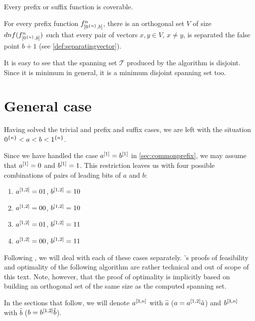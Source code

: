 \begin{corollary}
\label{corollary:prefixsuffixcoverable}
Every prefix or suffix function is coverable.
\end{corollary}

\begin{corollary}
\label{corollary:prefixdependence}
For every prefix function $f^{n}_{[0^{\{n\}}, b]}$,
there is an orthogonal set $V$
of size $dnf(f^{n}_{[0^{\{n\}}, b]})$
such that
every pair of vectors $x,y \in V$, $x \neq y$,
is separated the false point $b+1$
(see \cref{def:separatingvector}).
\end{corollary}

It is easy to see that the spanning set $\mathcal{T}$
produced by the algorithm is disjoint.
Since it is minimum in general,
it is a minimum disjoint spanning set too.

\section{General case}
\label{sec:1intervalgeneral}

Having solved the trivial and prefix and suffix cases,
we are left with the situation
$0^{\{n\}} < a < b < 1^{\{n\}}$.

Since we have handled the case $a^{[1]} = b^{[1]}$
in \cref{sec:commonprefix},
we may assume that $a^{[1]} = 0$ and $b^{[1]} = 1$.
This restriction leaves us with
four possible combinations of pairs
of leading bits of $a$ and $b$:

\begin{enumerate}
\item $a^{[1, 2]} = 01$, $b^{[1, 2]} = 10$
\item $a^{[1, 2]} = 00$, $b^{[1, 2]} = 10$
\item $a^{[1, 2]} = 01$, $b^{[1, 2]} = 11$
\item $a^{[1, 2]} = 00$, $b^{[1, 2]} = 11$
\end{enumerate}

Following \citet{Schieber2005154},
we will deal with each of these cases separately.
\citeauthor{Schieber2005154}'s proofs of feasibility
and optimality of the following
algorithm are rather technical and out of scope
of this text.
Note, however, that the proof of optimality is implicitly
based on building an orthogonal set of the same size
as the computed spanning set.

In the sections that follow,
we will denote $a^{[3, n]}$ with $\hat{a}$
($a = a^{[1, 2]} \hat{a}$)
and $b^{[3, n]}$ with $\hat{b}$
($b = b^{[1, 2]} \hat{b}$).

